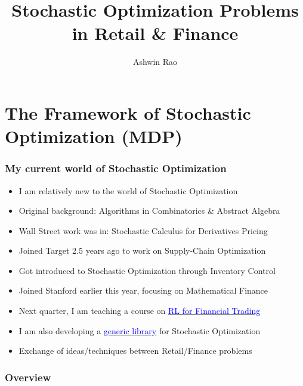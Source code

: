 \documentclass[handout]{beamer}
\title[Stochastic Optimization Problems]{Stochastic Optimization Problems in Retail \& Finance} %
\author{Ashwin Rao} %
\institute[Target/Stanford] %
{VP Data Science at Target \& Adjunct Faculty at Stanford
}
\date{} %
\begin{document}
\begin{frame}
\titlepage %
\end{frame}



\section{The Framework of Stochastic Optimization (MDP)}

\begin{frame}
\frametitle{My current world of Stochastic Optimization}
\pause
\begin{itemize}[<+->]
\item I am relatively new to the world of Stochastic Optimization
\item Original background: Algorithms in Combinatorics \& Abstract Algebra
\item Wall Street work was in: Stochastic Calculus for Derivatives Pricing
\item Joined Target 2.5 years ago to work on Supply-Chain Optimization
\item Got introduced to Stochastic Optimization through Inventory Control
\item Joined Stanford earlier this year, focusing on Mathematical Finance
\item Next quarter, I am teaching a course on \href{https://github.com/coverdrive/technical-documents/blob/master/finance/cme241/Stanford-CME241.pdf}{\underline{\textcolor{blue}{RL for Financial Trading}}}
\item I am also developing a \href{https://github.com/coverdrive/MDP-DP-RL}{\underline{\textcolor{blue}{generic library}}} for Stochastic Optimization 
\item Exchange of ideas/techniques between Retail/Finance problems
\end{itemize}
\end{frame}

\begin{frame}
\frametitle{Overview} %
\tableofcontents %
\end{frame}
\end{document}
